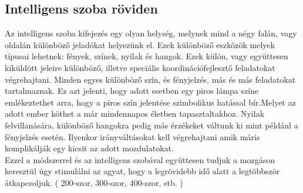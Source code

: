 \documentclass[tocnopagenum]{thesis-ekf}
\theoremstyle{definition}
\theoremstyle{remark}
\begin{document}
	
	\subsection*{Intelligens szoba röviden}
	Az intelligens szoba kifejezés egy olyan helység, melynek mind a négy falán, vagy oldalán különböző jeladókat helyezünk el.
	Ezek különböző eszközök melyek típusai lehetnek: fények, színek, nyilak és hangok. Ezek külön, vagy együttesen kiküldött jeleire különböző, illetve speciális koordinációfejlesztő feladatokat végrehajtani. Minden egyes különböző szín, és fényjelzés, más és más feladatokat tartalmaznak.
	Ez azt jelenti, hogy adott esetben egy piros lámpa színe emlékeztethet arra, hogy a piros szín jelentése szimbolikus hatással bír.Melyet az adott ember köthet a már mindennapos életben tapasztaltakhoz. Nyilak felvillanására, különböző hangokra pedig más érzékeket váltunk ki mint például a fényjelzés esetén. Ilyenkor irányváltásokat kell végrehajtani amik máris komplikálják egy kicsit az adott mozdulatokat.
	\\
	Ezzel a módszerrel és az intelligens szobával együttesen tudjuk a mozgáson keresztül úgy stimulálni az agyat, hogy a legrövidebb idő alatt a legtöbbször átkapcsoljuk. ( 200-szor, 300-szor, 400-szor, stb. )
	\par
\end{document}
